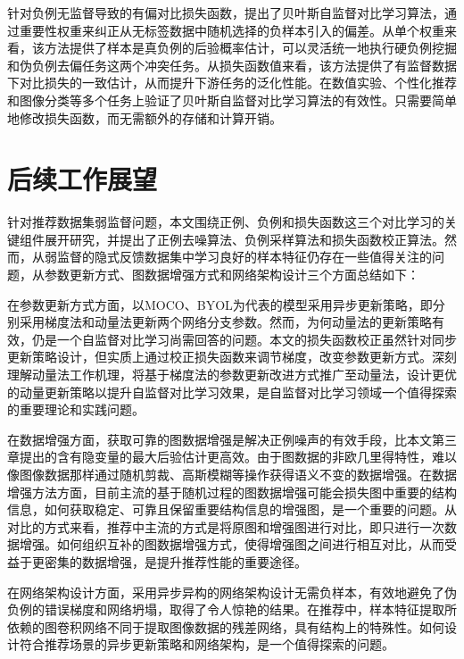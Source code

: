 针对负例无监督导致的有偏对比损失函数，提出了贝叶斯自监督对比学习算法，通过重要性权重来纠正从无标签数据中随机选择的负样本引入的偏差。从单个权重来看，该方法提供了样本是真负例的后验概率估计，可以灵活统一地执行硬负例挖掘和伪负例去偏任务这两个冲突任务。从损失函数值来看，该方法提供了有监督数据下对比损失的一致估计，从而提升下游任务的泛化性能。在数值实验、个性化推荐和图像分类等多个任务上验证了贝叶斯自监督对比学习算法的有效性。只需要简单地修改损失函数，而无需额外的存储和计算开销。

\section{后续工作展望}
\label{sec:conclusion}
针对推荐数据集弱监督问题，本文围绕正例、负例和损失函数这三个对比学习的关键组件展开研究，并提出了正例去噪算法、负例采样算法和损失函数校正算法。然而，从弱监督的隐式反馈数据集中学习良好的样本特征仍存在一些值得关注的问题，从参数更新方式、图数据增强方式和网络架构设计三个方面总结如下：

在参数更新方式方面，以MOCO、BYOL为代表的模型采用异步更新策略，即分别采用梯度法和动量法更新两个网络分支参数。然而，为何动量法的更新策略有效，仍是一个自监督对比学习尚需回答的问题。本文的损失函数校正虽然针对同步更新策略设计，但实质上通过校正损失函数来调节梯度，改变参数更新方式。深刻理解动量法工作机理，将基于梯度法的参数更新改进方式推广至动量法，设计更优的动量更新策略以提升自监督对比学习效果，是自监督对比学习领域一个值得探索的重要理论和实践问题。

在数据增强方面，获取可靠的图数据增强是解决正例噪声的有效手段，比本文第三章提出的含有隐变量的最大后验估计更高效。由于图数据的非欧几里得特性，难以像图像数据那样通过随机剪裁、高斯模糊等操作获得语义不变的数据增强。在数据增强方法方面，目前主流的基于随机过程的图数据增强可能会损失图中重要的结构信息，如何获取稳定、可靠且保留重要结构信息的增强图，是一个重要的问题。从对比的方式来看，推荐中主流的方式是将原图和增强图进行对比，即只进行一次数据增强。如何组织互补的图数据增强方式，使得增强图之间进行相互对比，从而受益于更密集的数据增强，是提升推荐性能的重要途径。

在网络架构设计方面，采用异步异构的网络架构设计无需负样本，有效地避免了伪负例的错误梯度和网络坍塌，取得了令人惊艳的结果。在推荐中，样本特征提取所依赖的图卷积网络不同于提取图像数据的残差网络，具有结构上的特殊性。如何设计符合推荐场景的异步更新策略和网络架构，是一个值得探索的问题。



